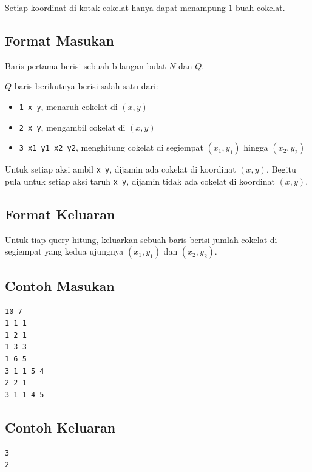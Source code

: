 \documentclass{article}
\begin{document}
\par\noindent Setiap koordinat di kotak cokelat hanya dapat menampung $1$ buah cokelat.

\subsection*{Format Masukan}

\par\noindent Baris pertama berisi sebuah bilangan bulat $N$ dan $Q$.
\par\noindent $Q$ baris berikutnya berisi salah satu dari:
\begin{itemize}
	\item \lstinline{1 x y}, menaruh cokelat di $(x,y)$
	\item \lstinline{2 x y}, mengambil cokelat di $(x,y)$
	\item \lstinline{3 x1 y1 x2 y2}, menghitung cokelat di segiempat $(x_1,y_1)$ hingga $(x_2,y_2)$
\end{itemize}
\par\noindent Untuk setiap aksi ambil \lstinline{x y}, dijamin ada cokelat di koordinat $(x,y)$. Begitu pula untuk setiap aksi taruh \lstinline{x y}, dijamin tidak ada cokelat di koordinat $(x,y)$.

\subsection*{Format Keluaran}

\par\noindent Untuk tiap query hitung, keluarkan sebuah baris berisi jumlah cokelat di segiempat yang kedua ujungnya $(x_1,y_1)$ dan $(x_2,y_2)$.

\subsection*{Contoh Masukan}

\begin{lstlisting}
10 7
1 1 1
1 2 1
1 3 3
1 6 5
3 1 1 5 4
2 2 1
3 1 1 4 5
\end{lstlisting}

\subsection*{Contoh Keluaran}

\begin{lstlisting}
3
2
\end{lstlisting}
\end{document}
